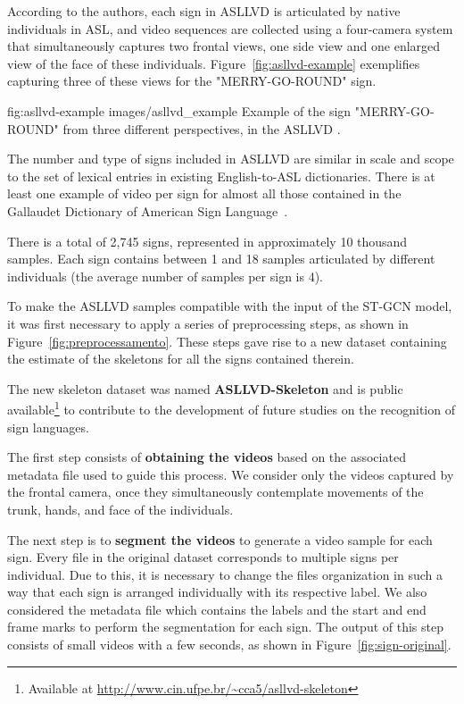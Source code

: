 According to the authors, each sign in ASLLVD is articulated by native individuals in ASL, and video sequences are collected using a four-camera system that simultaneously captures two frontal views, one side view and one enlarged view of the face of these individuals. Figure~\ref{fig:asllvd-example} exemplifies capturing three of these views for the "MERRY-GO-ROUND" sign. 

\image
    {fig:asllvd-example}
    {images/asllvd_example}
    {Example of the sign "MERRY-GO-ROUND" from three different perspectives, in the ASLLVD \cite[p. 2]{athitsos-asllvd-2008}.}
    
The number and type of signs included in ASLLVD are similar in scale and scope to the set of lexical entries in existing English-to-ASL dictionaries. There is at least one example of video per sign for almost all those contained in the Gallaudet Dictionary of American Sign Language~\cite{athitsos-asllvd-2008,gallaudet-2005}.

There is a total of 2,745 signs, represented in approximately 10 thousand samples. Each sign contains between 1 and 18 samples articulated by different individuals (the average number of samples per sign is 4).

To make the ASLLVD samples compatible with the input of the ST-GCN model, it was first necessary to apply a series of preprocessing steps, as shown in Figure~\ref{fig:preprocessamento}. These steps gave rise to a new dataset containing the estimate of the skeletons for all the signs contained therein.

The new skeleton dataset was named \textbf{ASLLVD-Skeleton} and is public available\footnote{
   Available at \url{http://www.cin.ufpe.br/~cca5/asllvd-skeleton}
} to contribute to the development of future studies on the recognition of sign languages.

The first step consists of \textbf{obtaining the videos} based on the associated metadata file used to guide this process. We consider only the videos captured by the frontal camera, once they simultaneously contemplate movements of the trunk, hands, and face of the individuals.

The next step is to \textbf{segment the videos} to generate a video sample for each sign. Every file in the original dataset corresponds to multiple signs per individual. Due to this, it is necessary to change the files organization in such a way that each sign is arranged individually with its respective label. We also considered the metadata file which contains the labels and the start and end frame marks to perform the segmentation for each sign. The output of this step consists of small videos with a few seconds, as shown in Figure~\ref{fig:sign-original}.

